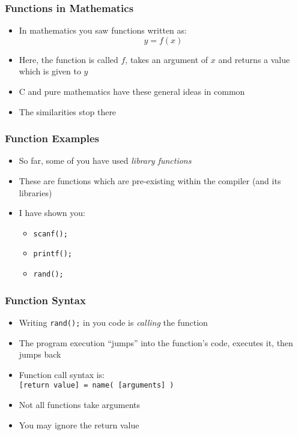 \documentclass[14pt]{beamer}
\begin{document}
\begin{frame}
\frametitle{Functions in Mathematics}
\begin{itemize}
\item In mathematics you saw functions written as:
\begin{equation*}
y = f(x)
\end{equation*}
\item Here, the function is called $f$, takes an argument of $x$ and returns a value which is given to $y$
\item C and pure mathematics have these general ideas in common
\pause
\item The similarities stop there
\end{itemize}
\end{frame}

\begin{frame}
\frametitle{Function Examples}
\begin{itemize}
\item So far, some of you have used \textit{library functions}
\item These are functions which are pre-existing within the compiler (and its libraries)
\item I have shown you:
	\begin{itemize}
		\item \texttt{scanf();}
		\item \texttt{printf();}
		\item \texttt{rand();}
	\end{itemize}
\end{itemize}
\end{frame}

\begin{frame}[fragile]
\frametitle{Function Syntax}
\begin{itemize}
\item Writing \texttt{rand();} in you code is \textit{calling} the function
\item The program execution ``jumps'' into the function's code, executes it, then jumps back
\item Function call syntax is:\\
{\small \texttt{[return value] = name( [arguments] )} }

\item Not all functions take arguments
\item You may ignore the return value
\end{itemize}
\end{frame}
\end{document}
